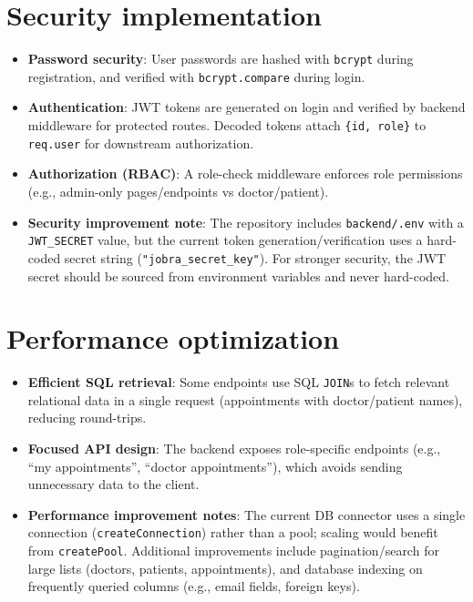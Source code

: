 \documentclass[12pt,a4paper]{article}
\begin{document}
\section{Security implementation}
\begin{itemize}[leftmargin=*, itemsep=0.4em]
  \item \textbf{Password security}: User passwords are hashed with \texttt{bcrypt} during registration, and verified with \texttt{bcrypt.compare} during login.
  \item \textbf{Authentication}: JWT tokens are generated on login and verified by backend middleware for protected routes. Decoded tokens attach \texttt{\{id, role\}} to \texttt{req.user} for downstream authorization.
  \item \textbf{Authorization (RBAC)}: A role-check middleware enforces role permissions (e.g., admin-only pages/endpoints vs doctor/patient).
  \item \textbf{Security improvement note}: The repository includes \texttt{backend/.env} with a \texttt{JWT\_SECRET} value, but the current token generation/verification uses a hard-coded secret string (\texttt{"jobra\_secret\_key"}). For stronger security, the JWT secret should be sourced from environment variables and never hard-coded.
\end{itemize}

\section{Performance optimization}
\begin{itemize}[leftmargin=*, itemsep=0.4em]
  \item \textbf{Efficient SQL retrieval}: Some endpoints use SQL \texttt{JOIN}s to fetch relevant relational data in a single request (appointments with doctor/patient names), reducing round-trips.
  \item \textbf{Focused API design}: The backend exposes role-specific endpoints (e.g., ``my appointments'', ``doctor appointments''), which avoids sending unnecessary data to the client.
  \item \textbf{Performance improvement notes}: The current DB connector uses a single connection (\texttt{createConnection}) rather than a pool; scaling would benefit from \texttt{createPool}. Additional improvements include pagination/search for large lists (doctors, patients, appointments), and database indexing on frequently queried columns (e.g., email fields, foreign keys).
\end{itemize}
\end{document}
